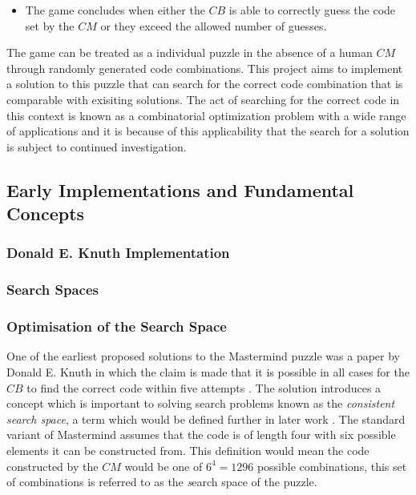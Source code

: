 \documentclass[12pt]{article}  %
\theoremstyle{definition}
\theoremstyle{remark}
\begin{document}
\begin {itemize}
\begin{figure}[H]
	\caption{A simplified representation of $CB$ attempting to break the code set by $CM$}
	\end{figure}
	\item {The game concludes when either the $CB$ is able to correctly guess the code set by the $CM$ or they exceed the allowed number of guesses.}
\end {itemize}

The game can be treated as a individual puzzle in the absence of a human $CM$ through randomly generated code combinations. This project aims to implement a solution to this puzzle that can search for the correct code combination that is comparable with exisiting solutions. The act of searching for the correct code in this context is known as a combinatorial optimization problem with a wide range of applications \cite{Haystack} and it is because of this applicability that the search for a solution is subject to continued investigation.


\subsection {Early Implementations and Fundamental Concepts}

\subsubsection {Donald E. Knuth Implementation}

\subsubsection {Search Spaces}

\subsubsection {Optimisation of the Search Space}

\par One of the earliest proposed solutions to the Mastermind puzzle was a paper by Donald E. Knuth in which the claim is made that it is possible in all cases for the $CB$ to find the correct code within five attempts \cite {Wolfram} \cite {Knuth}. The solution introduces a concept which is important to solving search problems known as the \emph{consistent search space}, a term which would be defined further in later work \cite{Merelo}. The standard variant of Mastermind assumes that the code is of length four with six possible elements it can be constructed from. This definition would mean the code constructed by the $CM$ would be one of $6^4 = 1296$ possible combinations, this set of combinations is referred to as the \emph search space of the puzzle. 
\end{document}

